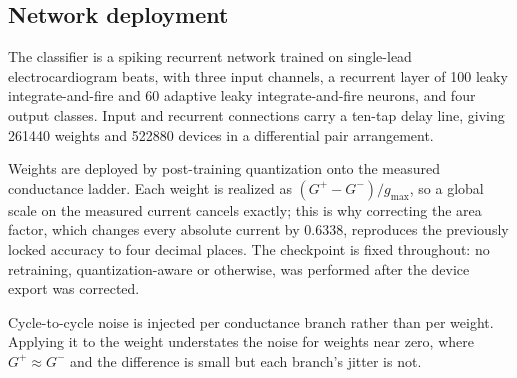 \subsection{Network deployment}

The classifier is a spiking recurrent network trained on single-lead electrocardiogram
beats, with three input channels, a recurrent layer of 100 leaky integrate-and-fire and
60 adaptive leaky integrate-and-fire neurons, and four output classes. Input and
recurrent connections carry a ten-tap delay line, giving \num{261440} weights and
\num{522880} devices in a differential pair arrangement.

Weights are deployed by post-training quantization onto the measured conductance ladder.
Each weight is realized as $(G^+ - G^-)/g_\mathrm{max}$, so a global scale on the
measured current cancels exactly; this is why correcting the area factor, which changes
every absolute current by \num{0.6338}, reproduces the previously locked accuracy to four
decimal places. The checkpoint is fixed throughout: no retraining, quantization-aware or
otherwise, was performed after the device export was corrected.

Cycle-to-cycle noise is injected per conductance branch rather than per weight. Applying
it to the weight understates the noise for weights near zero, where $G^+\approx G^-$ and
the difference is small but each branch's jitter is not.
